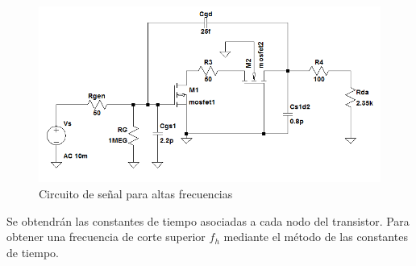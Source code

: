 \documentclass[10pt,spanish,a4paper,notitlepage]{article}
\begin{document}
\begin{figure}[H]
\centering
\includegraphics[scale=0.75]{circuitos/circuito_altas_frecuencias.png}
\caption{Circuito de señal para altas frecuencias}
\label{fig:circuito_alta_frec}
\end{figure}

Se obtendrán las constantes de tiempo asociadas a cada nodo del transistor.
Para obtener una frecuencia de corte superior $f_h$ mediante el método
de las constantes de tiempo.
\end{document}
